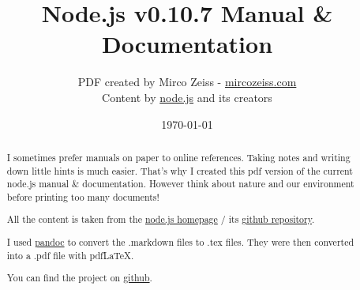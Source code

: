 \documentclass[10pt, a4paper, titlepage, oneside, plain]{article}
\begin{document}
	\title{Node.js v0.10.7 Manual \& Documentation}
	\author{PDF created by Mirco Zeiss - \href{http://mircozeiss.com}{mircozeiss.com}\\Content by \href{http://www.nodejs.org}{node.js} and its creators}
	\date{\today}

	\maketitle

	\begin{abstract}
	I sometimes prefer manuals on paper to online references. Taking notes and writing down little hints is much easier. That's why I created this pdf version of the current node.js manual \& documentation. However think about nature and our environment before printing too many documents!

	All the content is taken from the \href{http://www.nodejs.org}{node.js homepage} / its \href{https://github.com/joyent/node}{github repository}.

	I used \href{http://johnmacfarlane.net/pandoc/}{pandoc} to convert the .markdown files to .tex files. They were then converted into a .pdf file with pdfLaTeX.

	You can find the project on \href{https://github.com/zeMirco/nodejs-pdf-docs}{github}.
	\end{abstract}

	\tableofcontents

	
	
	
	
	
	
					
	
	
	
	
	
				
	
	
	
	
	
	
	
	
	
	
	
	
	
\end{document}
